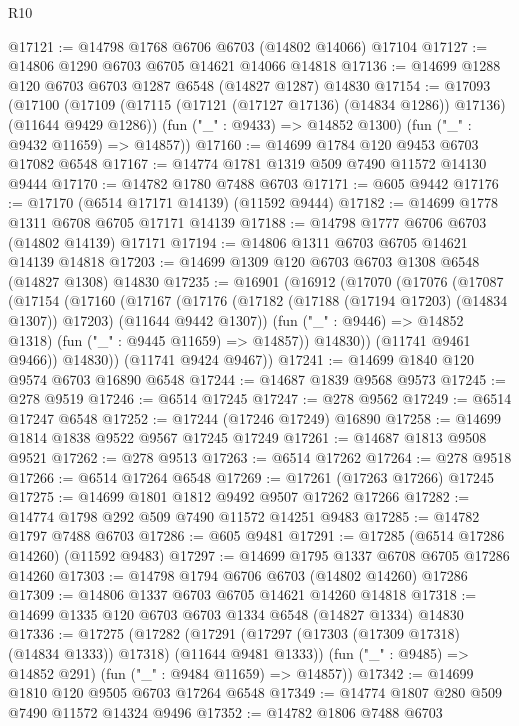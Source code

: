 \begin{lexlean}{R10}
\begin{coremodule}
@17121 := @14798 @1768 @6706 @6703 (@14802 @14066) @17104
@17127 := @14806 @1290 @6703 @6705 @14621 @14066 @14818
@17136 := @14699 @1288 @120 @6703 @6703 @1287 @6548 (@14827 @1287) @14830
@17154 := @17093
    (@17100
      (@17109 (@17115 (@17121 (@17127 @17136) (@14834 @1286)) @17136) (@11644 @9429 @1286))
      (fun ("_" : @9433) => @14852 @1300)
      (fun ("_" : @9432 @11659) => @14857))
@17160 := @14699 @1784 @120 @9453 @6703 @17082 @6548
@17167 := @14774 @1781 @1319 @509 @7490 @11572 @14130 @9444
@17170 := @14782 @1780 @7488 @6703
@17171 := @605 @9442
@17176 := @17170 (@6514 @17171 @14139) (@11592 @9444)
@17182 := @14699 @1778 @1311 @6708 @6705 @17171 @14139
@17188 := @14798 @1777 @6706 @6703 (@14802 @14139) @17171
@17194 := @14806 @1311 @6703 @6705 @14621 @14139 @14818
@17203 := @14699 @1309 @120 @6703 @6703 @1308 @6548 (@14827 @1308) @14830
@17235 := @16901
    (@16912
      (@17070
        (@17076
          (@17087
            (@17154
              (@17160
                (@17167
                  (@17176
                    (@17182 (@17188 (@17194 @17203) (@14834 @1307)) @17203)
                    (@11644 @9442 @1307))
                  (fun ("_" : @9446) => @14852 @1318)
                  (fun ("_" : @9445 @11659) => @14857))
                @14830))
            (@11741 @9461 @9466))
          @14830))
      (@11741 @9424 @9467))
@17241 := @14699 @1840 @120 @9574 @6703 @16890 @6548
@17244 := @14687 @1839 @9568 @9573
@17245 := @278 @9519
@17246 := @6514 @17245
@17247 := @278 @9562
@17249 := @6514 @17247 @6548
@17252 := @17244 (@17246 @17249) @16890
@17258 := @14699 @1814 @1838 @9522 @9567 @17245 @17249
@17261 := @14687 @1813 @9508 @9521
@17262 := @278 @9513
@17263 := @6514 @17262
@17264 := @278 @9518
@17266 := @6514 @17264 @6548
@17269 := @17261 (@17263 @17266) @17245
@17275 := @14699 @1801 @1812 @9492 @9507 @17262 @17266
@17282 := @14774 @1798 @292 @509 @7490 @11572 @14251 @9483
@17285 := @14782 @1797 @7488 @6703
@17286 := @605 @9481
@17291 := @17285 (@6514 @17286 @14260) (@11592 @9483)
@17297 := @14699 @1795 @1337 @6708 @6705 @17286 @14260
@17303 := @14798 @1794 @6706 @6703 (@14802 @14260) @17286
@17309 := @14806 @1337 @6703 @6705 @14621 @14260 @14818
@17318 := @14699 @1335 @120 @6703 @6703 @1334 @6548 (@14827 @1334) @14830
@17336 := @17275
    (@17282
      (@17291 (@17297 (@17303 (@17309 @17318) (@14834 @1333)) @17318) (@11644 @9481 @1333))
      (fun ("_" : @9485) => @14852 @291)
      (fun ("_" : @9484 @11659) => @14857))
@17342 := @14699 @1810 @120 @9505 @6703 @17264 @6548
@17349 := @14774 @1807 @280 @509 @7490 @11572 @14324 @9496
@17352 := @14782 @1806 @7488 @6703

\end{coremodule}
\end{lexlean}
